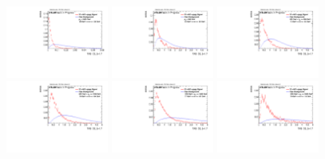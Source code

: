 \begin{figure}
\includegraphics[width=0.3\textwidth]{sascha_input/Appendix/Distributions/w/distributions/beta17/h_assisted_tj_C2_17_bin6.pdf} 
\bigskip
\includegraphics[width=0.3\textwidth]{sascha_input/Appendix/Distributions/w/distributions/beta17/h_assisted_tj_D2_17_bin1.pdf} \hspace{1mm}
\includegraphics[width=0.3\textwidth]{sascha_input/Appendix/Distributions/w/distributions/beta17/h_assisted_tj_D2_17_bin2.pdf} \hspace{1mm}
\includegraphics[width=0.3\textwidth]{sascha_input/Appendix/Distributions/w/distributions/beta17/h_assisted_tj_D2_17_bin3.pdf} 
\bigskip
\includegraphics[width=0.3\textwidth]{sascha_input/Appendix/Distributions/w/distributions/beta17/h_assisted_tj_D2_17_bin4.pdf} \hspace{1mm}
\includegraphics[width=0.3\textwidth]{sascha_input/Appendix/Distributions/w/distributions/beta17/h_assisted_tj_D2_17_bin5.pdf} \hspace{1mm}

\end{figure}
